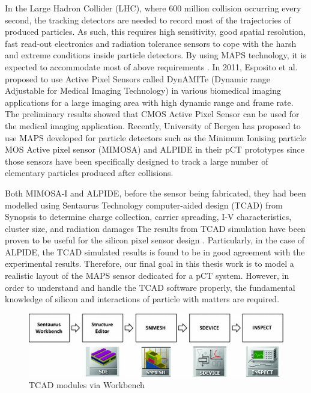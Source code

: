 \documentclass[12pt,a4paper]{article}
\begin{document}
In the Large Hadron Collider (LHC),  where 600 million collision occurring every second, the tracking detectors are needed to record most of the trajectories of produced particles. As such, this requires  high sensitivity,  good spatial resolution, fast read-out electronics and radiation tolerance sensors to cope with the harsh and extreme conditions inside particle detectors.  By using MAPS  technology, it is expected to accommodate most of above requirements  \cite{1748-0221-10-08-C08016}.  In 2011, Esposito et al. proposed to use Active Pixel Sensors called DynAMITe (Dynamic range Adjustable for Medical Imaging Technology) in various biomedical imaging applications for a large imaging area with high dynamic range and frame rate\cite{Esposito_2011}. The preliminary results showed that  CMOS Active Pixel Sensor  can be used for the medical imaging application.  Recently, University of  Bergen has proposed to use MAPS  developed for particle detectors such as the Minimum Ionising particle MOS Active pixel sensor (MIMOSA) and ALPIDE  in their pCT prototypes since those sensors have  been specifically designed to track a large number of elementary particles produced after collisions.

Both MIMOSA-I and ALPIDE, before the sensor being fabricated, they had been modelled  using  Sentaurus  Technology computer-aided design (TCAD) from  Synopsis to determine  charge collection, carrier spreading, I-V characteristics, cluster size, and radiation damages  The results from  TCAD simulation have been proven to be useful for the silicon pixel sensor design \cite{Charge-TCAD}. Particularly, in the case of  ALPIDE, the TCAD simulated results is found to be in good agreement with the experimental results. Therefore, our final goal in this thesis work is to model a realistic layout of the MAPS sensor dedicated for a pCT system.  However, in order to understand and handle the TCAD software properly, the fundamental knowledge of silicon and interactions of particle with matters are required.  


\begin{figure}[hbt]
\centering
  \includegraphics[width=15cm]{figure/TCAD.jpg}
  \caption{TCAD modules via Workbench}
\end{figure}
\end{document}
